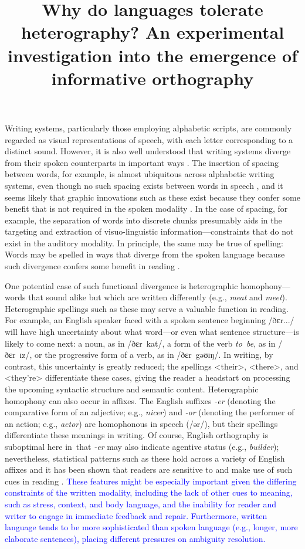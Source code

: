\documentclass[doc,biblatex]{apa7}
\title{Why do languages tolerate heterography? An experimental investigation into the emergence of informative orthography}
\newcommand\newmaterial[1]{\textcolor{blue}{#1}}
\begin{document}
\maketitle

\noindent
Writing systems, particularly those employing alphabetic scripts, are commonly regarded as visual representations of speech, with each letter corresponding to a distinct sound. However, it is also well understood that writing systems diverge from their spoken counterparts in important ways \parencite{Bolinger:1946, Coulmas:1991}. The insertion of spacing between words, for example, is almost ubiquitous across alphabetic writing systems, even though no such spacing exists between words in speech \parencite{Parkes:1992, Saenger:1997}, and it seems likely that graphic innovations such as these exist because they confer some benefit that is not required in the spoken modality \parencite{Rastle:2019}. In the case of spacing, for example, the separation of words into discrete chunks presumably aids in the targeting and extraction of visuo-linguistic information---constraints that do not exist in the auditory modality. In principle, the same may be true of spelling: Words may be spelled in ways that diverge from the spoken language because such divergence confers some benefit in reading \parencite{Ulicheva:2020}.

One potential case of such functional divergence is heterographic homophony---words that sound alike but which are written differently (e.g., \textit{meat} and \textit{meet}). Heterographic spellings such as these may serve a valuable function in reading. For example, an English speaker faced with a spoken sentence beginning /ðɛr.../ will have high uncertainty about what word---or even what sentence structure---is likely to come next: a noun, as in /ðɛr~kat/, a form of the verb \textit{to~be}, as in /ðɛr~ɪz/, or the progressive form of a verb, as in /ðɛr~gəʊɪŋ/. In writing, by contrast, this uncertainty is greatly reduced; the spellings <their>, <there>, and <they're> differentiate these cases, giving the reader a headstart on processing the upcoming syntactic structure and semantic content. Heterographic homophony can also occur in affixes. The English suffixes \textit{-er} (denoting the comparative form of an adjective; e.g., \textit{nicer}) and \textit{-or} (denoting the performer of an action; e.g., \textit{actor}) are homophonous in speech (/ər/), but their spellings differentiate these meanings in writing. Of course, English orthography is suboptimal here in~that \textit{-er} may also indicate agentive status (e.g., \textit{builder}); nevertheless, statistical patterns such as these hold across a variety of English affixes \parencite{Berg:2017} and it has been shown that readers are sensitive to and make use of such cues in reading \parencite{Ulicheva:2020}. \newmaterial{These features might be especially important given the differing constraints of the written modality, including the lack of other cues to meaning, such as stress, context, and body language, and the inability for reader and writer to engage in immediate feedback and repair. Furthermore, written language tends to be more sophisticated than spoken language (e.g., longer, more elaborate sentences), placing different pressures on ambiguity resolution.}
\end{document}
